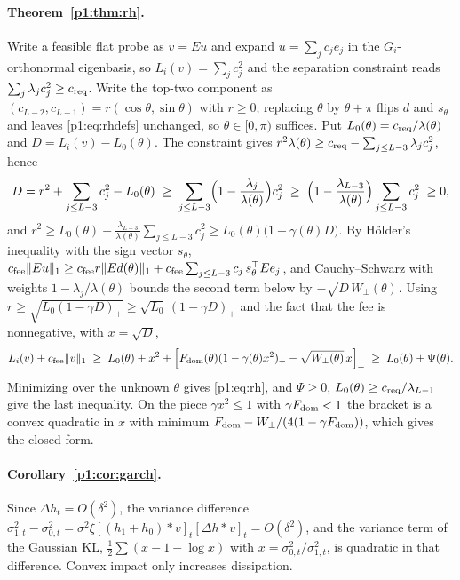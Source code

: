 \paragraph{Theorem~\ref{p1:thm:rh}.} Write a feasible flat probe as $v=Eu$ and expand $u=\sum_jc_je_j$ in the $G_i$-orthonormal eigenbasis, so $L_i(v)=\sum_jc_j^2$ and the separation constraint reads $\sum_j\lambda_jc_j^2\ge c_{\rm req}$. Write the top-two component as $(c_{L-2},c_{L-1})=r(\cos\theta,\sin\theta)$ with $r\ge0$; replacing $\theta$ by $\theta+\pi$ flips $d$ and $s_\theta$ and leaves \eqref{p1:eq:rhdefs} unchanged, so $\theta\in[0,\pi)$ suffices. Put $L_0(\theta)=c_{\rm req}/\lambda(\theta)$ and $D=L_i(v)-L_0(\theta)$. The constraint gives $r^2\lambda(\theta)\ge c_{\rm req}-\sum_{j\le L-3}\lambda_jc_j^2$, hence
\[
D=r^2+\sum_{j\le L-3}c_j^2-L_0(\theta)\;\ge\;\sum_{j\le L-3}\Bigl(1-\frac{\lambda_j}{\lambda(\theta)}\Bigr)c_j^2\;\ge\;\Bigl(1-\frac{\lambda_{L-3}}{\lambda(\theta)}\Bigr)\sum_{j\le L-3}c_j^2\;\ge0,
\]
and $r^2\ge L_0(\theta)-\frac{\lambda_{L-3}}{\lambda(\theta)}\sum_{j\le L-3}c_j^2\ge L_0(\theta)\bigl(1-\gamma(\theta)D\bigr)$. By H\"older's inequality with the sign vector $s_\theta$, $c_{\rm fee}\|Eu\|_1\ge c_{\rm fee}r\|Ed(\theta)\|_1+c_{\rm fee}\sum_{j\le L-3}c_j\,s_\theta^\top Ee_j$, and Cauchy--Schwarz with weights $1-\lambda_j/\lambda(\theta)$ bounds the second term below by $-\sqrt{D\,W_\perp(\theta)}$. Using $r\ge\sqrt{L_0(1-\gamma D)_+}\ge\sqrt{L_0}\,(1-\gamma D)_+$ and the fact that the fee is nonnegative, with $x=\sqrt D$,
\[
L_i(v)+c_{\rm fee}\|v\|_1\;\ge\;L_0(\theta)+x^2+\Bigl[F_{\rm dom}(\theta)(1-\gamma(\theta)x^2)_+-\sqrt{W_\perp(\theta)}\,x\Bigr]_+\;\ge\;L_0(\theta)+\Psi(\theta).
\]
Minimizing over the unknown $\theta$ gives \eqref{p1:eq:rh}, and $\Psi\ge0$, $L_0(\theta)\ge c_{\rm req}/\lambda_{L-1}$ give the last inequality. On the piece $\gamma x^2\le1$ with $\gamma F_{\rm dom}<1$ the bracket is a convex quadratic in $x$ with minimum $F_{\rm dom}-W_\perp/(4(1-\gamma F_{\rm dom}))$, which gives the closed form.

\paragraph{Corollary~\ref{p1:cor:garch}.} Since $\Delta h_t=O(\delta^2)$, the variance difference $\sigma^2_{1,t}-\sigma^2_{0,t}=\sigma^2\xi[(h_1+h_0)*v]_t[\Delta h*v]_t=O(\delta^2)$, and the variance term of the Gaussian KL, $\tfrac12\sum(x-1-\log x)$ with $x=\sigma^2_{0,t}/\sigma^2_{1,t}$, is quadratic in that difference. Convex impact only increases dissipation.

